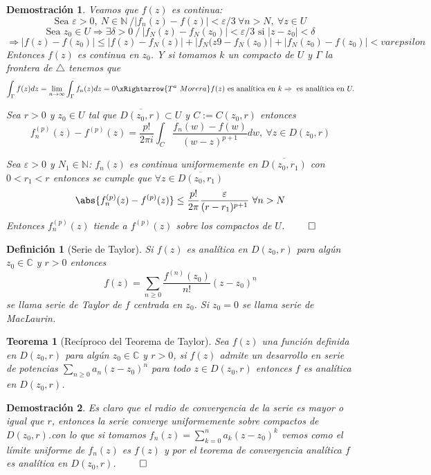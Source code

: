 \documentclass[10pt]{book}
\newtheorem{defi}{Definición}[chapter]
\newtheorem{theorem}{Teorema}[chapter]
\newtheorem*{dem}{Demostración}
\newcommand{\C}{\mathbb{C}}
\newcommand{\N}{\mathbb{N}}
\begin{document}
\begin{dem}
Veamos que $f(z)$ es continua:
$$\text{Sea } \varepsilon >0,\ N \in \N\ / |f_n(z)-f(z)| < \varepsilon/3\ \forall n> N,\ \forall z\in U$$
$$\text{Sea } z_0 \in U \Rightarrow \exists \delta >0\ /\ |f_N(z)-f_N(z_0)|<\varepsilon/3 \text{ si }|z-z_0|<\delta$$
$$ \Rightarrow |f(z)-f(z_0)| \leq |f(z)-f_N(z)|+|f_N(z9-f_N(z_0)|+|f_N(z_0)-f(z_0)|<varepsilon$$
Entonces $f(z)$ es continua en $z_0$. Y si tomamos $k$ un compacto de $U$ y $\Gamma$ la frontera de $\triangle$ tenemos que
$$\int_\Gamma f(z)dz = \lim_{n\to \infty}\int_\Gamma f_n(z)dz = 0 \xRightarrow{T^a\ Morera} f(z) \text{ es analítica en } k\Rightarrow \text{ es analítica en } U.$$

Sea $r>0$ y $z_0\in U$ tal que $\overline{D(z_0,r)}\subset U$ y $C := C(z_0,r)$ entonces
$$f_n^{(p)}(z) - f^{(p)}(z) = \frac{p!}{2\pi i}\int_C \frac{f_n(w)-f(w)}{(w-z)^{p+1}}dw,\ \forall z\in D(z_0,r)$$

Sea $\varepsilon >0$ y $N_1 \in \N$: $f_n(z)$ es continua uniformemente en $\overline{D(z_0,r_1)}$ con $0<r_1<r$ entonces  se cumple que $\forall z \in\overline{D(z_0,r_1)}$
$$\abs{f_n^{(p)}(z) - f^{(p)}(z)} \leq \frac{p!}{2\pi}\frac{\varepsilon}{(r-r_1)^{p+1}}\ \forall n>N$$
Entonces $f_n^{(p)}(z)$ tiende a $f^{(p)}(z)$ sobre los compactos de $U$. $\qed$
\end{dem}

\begin{defi}[Serie de Taylor]
Si $f(z)$ es analítica en $D(z_0,r)$ para algún $z_0\in\C$ y $r>0$ entonces
$$f(z) = \sum_{n\geq 0} \frac{f^{(n)}(z_0)}{n!}(z-z_0)^n$$
se llama serie de Taylor de $f$ centrada en $z_0$. Si $z_0=0$ se llama serie de MacLaurin. 
\end{defi}


\begin{theorem}[Recíproco del Teorema de Taylor]
Sea $f(z)$ una función definida en $D(z_0,r)$ para algún $z_0\in \C$ y $r>0$, si $f(z)$ admite un desarrollo en serie de potencias $\sum_{n\geq 0} a_n(z-z_0)^n$ para todo $z\in D(z_0,r)$ entonces $f$ es analítica en $D(z_0,r)$.
\end{theorem}

\begin{dem}
Es claro que el radio de convergencia de la serie es mayor o igual que $r$, entonces la serie converge uniformemente sobre compactos de $D(z_0,r)$.con lo que si tomamos $f_n(z) = \sum_{k= 0}^n a_k(z-z_0)^k$ vemos como el límite uniforme de $f_n(z)$ es $f(z)$ y por el teorema de convergencia analítica $f$ es analítica en $D(z_0,r)$. $\qed$
\end{dem}
\end{document}
